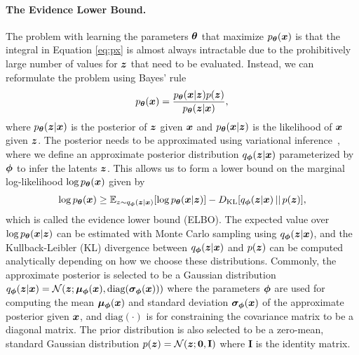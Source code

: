 \paragraph{The Evidence Lower Bound.} The problem with learning the parameters ${\bm{\theta}}$ that maximize $p_{{\bm{\theta}}}({\bm{x}})$ is that the integral in Equation \ref{eq:px} is almost always intractable due to the 
prohibitively large number of values for ${\bm{z}}$ that need to be evaluated. %
Instead, we can reformulate the problem using Bayes' rule %
\begin{equation}
	p_{{\bm{\theta}}}({\bm{x}}) = \frac{p_{{\bm{\theta}}}({\bm{x}} | {\bm{z}}) p({\bm{z}}) }{p_{{\bm{\theta}}}({\bm{z}} | {\bm{x}})},
\end{equation}
where $p_{{\bm{\theta}}}({\bm{z}} | {\bm{x}})$ is the posterior of ${\bm{z}}$ given ${\bm{x}}$ and $p_{{\bm{\theta}}}({\bm{x}} | {\bm{z}})$ is the likelihood of ${\bm{x}}$ given ${\bm{z}}$. The posterior needs to be approximated using variational inference~\cite{zhang2018advances,blei2017variational}, where we define an approximate posterior distribution $q_{{\bm{\phi}}}({\bm{z}} | {\bm{x}})$ parameterized by ${\bm{\phi}}$ to infer the latents ${\bm{z}}$.  
This allows us to form a lower bound on the marginal log-likelihood $\log p_{{\bm{\theta}}}({\bm{x}})$ given by 
\begin{align}\label{eq:elbo}
	\log p_{{\bm{\theta}}}({\bm{x}}) \geq \mathbb{E}_{z \sim q_{{\bm{\phi}}}({\bm{z}} | {\bm{x}})}[\log p_{{\bm{\theta}}}({\bm{x}} | {\bm{z}})] - D_{\mathrm{KL}}[q_{{\bm{\phi}}}({\bm{z}} |  {\bm{x}}) \, || \, p({\bm{z}})] ,
\end{align}
which is called the evidence lower bound (ELBO). The expected value over $\log p_{{\bm{\theta}}}({\bm{x}} | {\bm{z}})$ can be estimated with Monte Carlo sampling using $q_{{\bm{\phi}}}({\bm{z}} | {\bm{x}})$, and the Kullback-Leibler (KL) divergence between $q_{{\bm{\phi}}}({\bm{z}} |  {\bm{x}})$ and $p({\bm{z}})$ can be computed analytically depending on how we choose these distributions. Commonly, the approximate posterior is selected to be a Gaussian distribution $q_{{\bm{\phi}}}({\bm{z}} | {\bm{x}}) = {\mathcal{N}}({\bm{z}}; {\bm{\mu}}_{{\bm{\phi}}}({\bm{x}}), \text{diag}({\bm{\sigma}}_{{\bm{\phi}}}({\bm{x}})))$ where the parameters ${\bm{\phi}}$ are used for computing the mean ${\bm{\mu}}_{{\bm{\phi}}}({\bm{x}})$ and standard deviation ${\bm{\sigma}}_{{\bm{\phi}}}({\bm{x}})$ of the approximate posterior given ${\bm{x}}$, and $\text{diag}(\cdot)$ is for constraining the covariance matrix to be a diagonal matrix. The prior distribution is also selected to be a zero-mean, standard Gaussian distribution $p({\bm{z}}) = {\mathcal{N}}({\bm{z}}; \mathbf{0}, \mathbf{I})$ where $\mathbf{I}$ is the identity matrix. 

